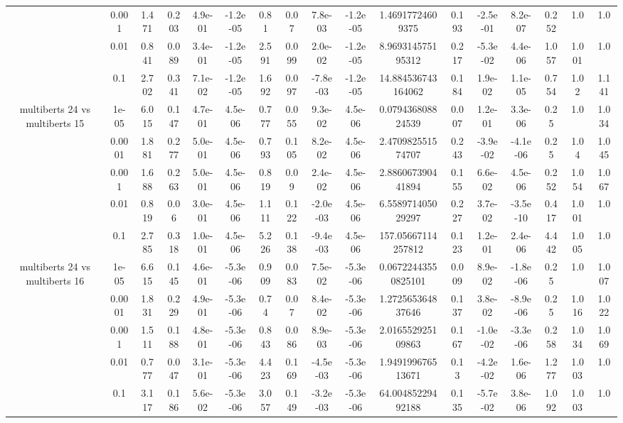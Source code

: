 \begin{tabular}{|c|c|c|c|c|c|c|c|c|c|c|c|c|c|c|c|c|}
 & 0.001 & 1.471 & 0.203 & 4.9e-01 & -1.2e-05 & 0.81 & 0.07 & 7.8e-03 & -1.2e-05 & 1.46917724609375 & 0.193 & -2.5e-01 & 8.2e-07 & 0.252 & 1.0 & 1.0 \\
 & 0.01 & 0.841 & 0.089 & 3.4e-01 & -1.2e-05 & 2.591 & 0.099 & 2.0e-02 & -1.2e-05 & 8.969314575195312 & 0.217 & -5.3e-02 & 4.4e-06 & 1.057 & 1.001 & 1.0 \\
 & 0.1 & 2.702 & 0.341 & 7.1e-02 & -1.2e-05 & 1.692 & 0.097 & -7.8e-03 & -1.2e-05 & 14.884536743164062 & 0.184 & 1.9e-02 & 1.1e-05 & 0.754 & 1.02 & 1.141 \\
\hline
\multirow{5}{*}{multiberts 24 vs multiberts 15} & 1e-05 & 6.015 & 0.147 & 4.7e-01 & 4.5e-06 & 0.777 & 0.055 & 9.3e-02 & 4.5e-06 & 0.079436808824539 & 0.007 & 1.2e-01 & 3.3e-06 & 0.25 & 1.0 & 1.034 \\
 & 0.0001 & 1.881 & 0.277 & 5.0e-01 & 4.5e-06 & 0.793 & 0.105 & 8.2e-02 & 4.5e-06 & 2.470982551574707 & 0.243 & -3.9e-02 & -4.1e-06 & 0.25 & 1.04 & 1.045 \\
 & 0.001 & 1.688 & 0.263 & 5.0e-01 & 4.5e-06 & 0.819 & 0.09 & 2.4e-02 & 4.5e-06 & 2.886067390441894 & 0.155 & 6.6e-02 & 4.5e-06 & 0.252 & 1.054 & 1.067 \\
 & 0.01 & 0.819 & 0.06 & 3.0e-01 & 4.5e-06 & 1.111 & 0.122 & -2.0e-03 & 4.5e-06 & 6.558971405029297 & 0.227 & 3.7e-02 & -3.5e-10 & 0.417 & 1.001 & 1.0 \\
 & 0.1 & 2.785 & 0.318 & 1.0e-01 & 4.5e-06 & 5.226 & 0.138 & -9.4e-03 & 4.5e-06 & 157.05667114257812 & 0.123 & 1.2e-01 & 2.4e-06 & 4.442 & 1.005 & 1.0 \\
\hline
\multirow{5}{*}{multiberts 24 vs multiberts 16} & 1e-05 & 6.615 & 0.145 & 4.6e-01 & -5.3e-06 & 0.909 & 0.083 & 7.5e-02 & -5.3e-06 & 0.06722443550825101 & 0.009 & 8.9e-02 & -1.8e-06 & 0.25 & 1.0 & 1.007 \\
 & 0.0001 & 1.831 & 0.229 & 4.9e-01 & -5.3e-06 & 0.74 & 0.07 & 8.4e-02 & -5.3e-06 & 1.272565364837646 & 0.137 & 3.8e-02 & -8.9e-06 & 0.25 & 1.016 & 1.022 \\
 & 0.001 & 1.511 & 0.188 & 4.8e-01 & -5.3e-06 & 0.843 & 0.086 & 8.9e-03 & -5.3e-06 & 2.016552925109863 & 0.167 & -1.0e-02 & -3.3e-06 & 0.258 & 1.034 & 1.069 \\
 & 0.01 & 0.777 & 0.047 & 3.1e-01 & -5.3e-06 & 4.423 & 0.169 & -4.5e-03 & -5.3e-06 & 1.949199676513671 & 0.13 & -4.2e-02 & 1.6e-06 & 1.277 & 1.003 & 1.0 \\
 & 0.1 & 3.117 & 0.186 & 5.6e-02 & -5.3e-06 & 3.057 & 0.149 & -3.2e-03 & -5.3e-06 & 64.00485229492188 & 0.135 & -5.7e-02 & 3.8e-06 & 1.092 & 1.003 & 1.0 \\

\end{tabular}
